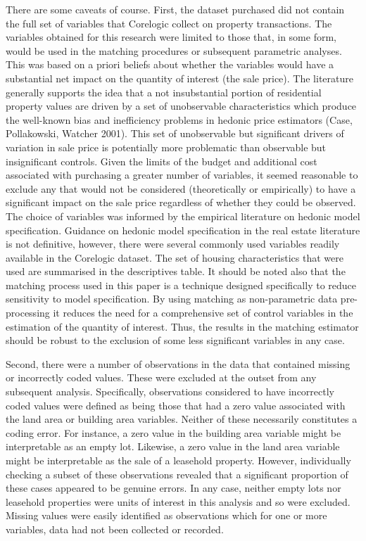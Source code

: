 \documentclass[]{article}
\begin{document}
There are some caveats of course. First, the dataset purchased did not
contain the full set of variables that Corelogic collect on property
transactions. The variables obtained for this research were limited to
those that, in some form, would be used in the matching procedures or
subsequent parametric analyses. This was based on a priori beliefs about
whether the variables would have a substantial net impact on the
quantity of interest (the sale price). The literature generally supports
the idea that a not insubstantial portion of residential property values
are driven by a set of unobservable characteristics which produce the
well-known bias and inefficiency problems in hedonic price estimators
(Case, Pollakowski, Watcher 2001). This set of unobservable but
significant drivers of variation in sale price is potentially more
problematic than observable but insignificant controls. Given the limits
of the budget and additional cost associated with purchasing a greater
number of variables, it seemed reasonable to exclude any that would not
be considered (theoretically or empirically) to have a significant
impact on the sale price regardless of whether they could be observed.
The choice of variables was informed by the empirical literature on
hedonic model specification. Guidance on hedonic model specification in
the real estate literature is not definitive, however, there were
several commonly used variables readily available in the Corelogic
dataset. The set of housing characteristics that were used are
summarised in the descriptives table. It should be noted also that the
matching process used in this paper is a technique designed specifically
to reduce sensitivity to model specification. By using matching as
non-parametric data pre-processing it reduces the need for a
comprehensive set of control variables in the estimation of the quantity
of interest. Thus, the results in the matching estimator should be
robust to the exclusion of some less significant variables in any case.

Second, there were a number of observations in the data that contained
missing or incorrectly coded values. These were excluded at the outset
from any subsequent analysis. Specifically, observations considered to
have incorrectly coded values were defined as being those that had a
zero value associated with the land area or building area variables.
Neither of these necessarily constitutes a coding error. For instance, a
zero value in the building area variable might be interpretable as an
empty lot. Likewise, a zero value in the land area variable might be
interpretable as the sale of a leasehold property. However, individually
checking a subset of these observations revealed that a significant
proportion of these cases appeared to be genuine errors. In any case,
neither empty lots nor leasehold properties were units of interest in
this analysis and so were excluded. Missing values were easily
identified as observations which for one or more variables, data had not
been collected or recorded.
\end{document}
